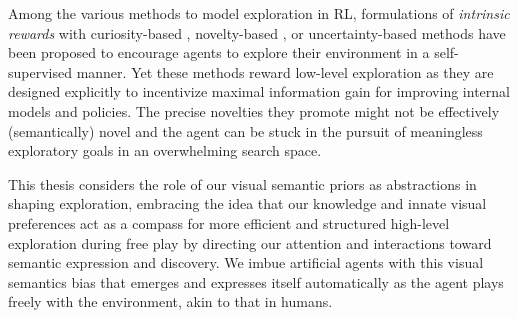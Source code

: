 Among the various methods to model exploration in RL, formulations of \emph{intrinsic rewards} \citep{exploration_survey} with curiosity-based \citep{icm,vime}, novelty-based \citep{burda2018largescale,novel_explore}, or uncertainty-based \citep{rnd,plan_explore,disagreement} methods have been proposed to encourage agents to explore their environment in a self-supervised manner. 
Yet these methods reward low-level exploration as they are designed explicitly to incentivize maximal information gain for improving internal models and policies.
The precise novelties they promote might not be effectively (semantically) novel and the agent can be stuck in the pursuit of meaningless exploratory goals in an overwhelming search space.


This thesis considers the role of our visual semantic priors as abstractions in shaping exploration, embracing the idea that our knowledge and innate visual preferences act as a compass for more efficient and structured high-level exploration during free play by directing our attention and interactions toward semantic expression and discovery.
We imbue artificial agents with this visual semantics bias that emerges and expresses itself automatically as the agent plays freely with the environment, akin to that in humans.

